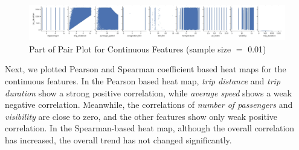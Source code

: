 \documentclass[11pt]{article}
\begin{document}
\begin{figure}[h]
  \centering
  \includegraphics[width=1\textwidth]{part of pair plot.jpg}
  \caption{Part of Pair Plot for Continuous Features (sample size $=$ 0.01)}
  \vspace{-10pt}
  \label{fig:my_label}
\end{figure}

Next, we plotted Pearson and Spearman coefficient based heat maps for the continuous features. In the Pearson based heat map, \textit{trip distance} and \textit{trip duration} show a strong positive correlation, while \textit{average speed} shows a weak negative correlation. Meanwhile, the correlations of \textit{number of passengers} and \textit{visibility} are close to zero, and the other features show only weak positive correlation. In the Spearman-based heat map, although the overall correlation has increased, the overall trend has not changed significantly.
\end{document}
